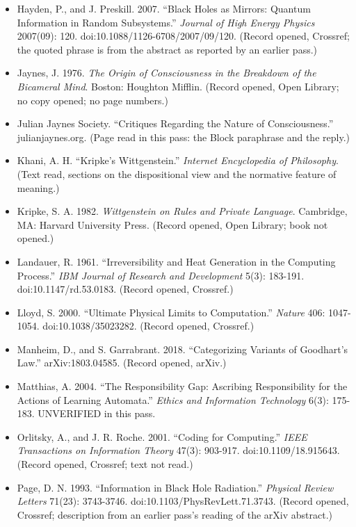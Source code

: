\documentclass[11pt]{article}
\begin{document}
\begin{itemize}
\item Hayden, P., and J. Preskill. 2007. ``Black Holes as Mirrors: Quantum Information in Random Subsystems.'' \emph{Journal of High Energy Physics} 2007(09): 120. doi:10.1088/\allowbreak{}1126-6708/\allowbreak{}2007/\allowbreak{}09/\allowbreak{}120. (Record opened, Crossref; the quoted phrase is from the abstract as reported by an earlier pass.)
\item Jaynes, J. 1976. \emph{The Origin of Consciousness in the Breakdown of the Bicameral Mind}. Boston: Houghton Mifflin. (Record opened, Open Library; no copy opened; no page numbers.)
\item Julian Jaynes Society. ``Critiques Regarding the Nature of Consciousness.'' julianjaynes.org. (Page read in this pass: the Block paraphrase and the reply.)
\item Khani, A. H. ``Kripke's Wittgenstein.'' \emph{Internet Encyclopedia of Philosophy}. (Text read, sections on the dispositional view and the normative feature of meaning.)
\item Kripke, S. A. 1982. \emph{Wittgenstein on Rules and Private Language}. Cambridge, MA: Harvard University Press. (Record opened, Open Library; book not opened.)
\item Landauer, R. 1961. ``Irreversibility and Heat Generation in the Computing Process.'' \emph{IBM Journal of Research and Development} 5(3): 183-191. doi:10.1147/\allowbreak{}rd.53.0183. (Record opened, Crossref.)
\item Lloyd, S. 2000. ``Ultimate Physical Limits to Computation.'' \emph{Nature} 406: 1047-1054. doi:10.1038/\allowbreak{}35023282. (Record opened, Crossref.)
\item Manheim, D., and S. Garrabrant. 2018. ``Categorizing Variants of Goodhart's Law.'' arXiv:1803.04585. (Record opened, arXiv.)
\item Matthias, A. 2004. ``The Responsibility Gap: Ascribing Responsibility for the Actions of Learning Automata.'' \emph{Ethics and Information Technology} 6(3): 175-183. UNVERIFIED in this pass.
\item Orlitsky, A., and J. R. Roche. 2001. ``Coding for Computing.'' \emph{IEEE Transactions on Information Theory} 47(3): 903-917. doi:10.1109/\allowbreak{}18.915643. (Record opened, Crossref; text not read.)
\item Page, D. N. 1993. ``Information in Black Hole Radiation.'' \emph{Physical Review Letters} 71(23): 3743-3746. doi:10.1103/\allowbreak{}PhysRevLett.71.3743. (Record opened, Crossref; description from an earlier pass's reading of the arXiv abstract.)

\end{itemize}
\end{document}
